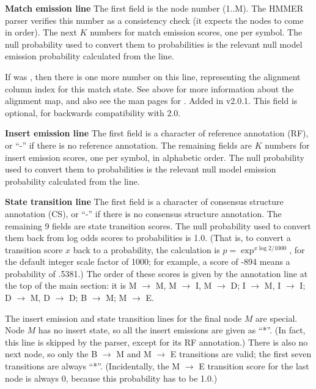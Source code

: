 \begin{wideitem}

\item [\textbf{Match emission line}] The first field is the node number (1..M).
The HMMER parser verifies this number as a consistency check (it
expects the nodes to come in order). The next $K$ numbers for match
emission scores, one per symbol. The null probability used to convert
them to probabilities is the relevant null model emission probability
calculated from the  line.

If  was , then there is one more number on this
line, representing the alignment column index for this match state.
See  above for more information about the alignment map, and
also see the man pages for .  Added in
v2.0.1. This field is optional, for backwards compatibility with 2.0.

\item [\textbf{Insert emission line}] The first field is a character of
reference annotation (RF), or ``-'' if there is no reference
annotation. The remaining fields are $K$ numbers for insert emission
scores, one per symbol, in alphabetic order. The null probability used
to convert them to probabilities is the relevant null model emission
probability calculated from the  line.

\item [\textbf{State transition line}] The first field is a character
of consensus structure annotation (CS), or ``-'' if there is no
consensus structure annotation. The remaining 9 fields are state
transition scores. The null probability used to convert them back from
log odds scores to probabilities is 1.0. (That is, to convert a
transition score $x$ back to a probability, the calculation is $p =
\exp^{x \log 2 / 1000}$, for the default integer scale factor of 1000;
for example, a score of -894 means a probability of .5381.)  The order
of these scores is given by the annotation line at the top of the main
section: it is M $\rightarrow$ M, M $\rightarrow$ I, M $\rightarrow$
D; I $\rightarrow$ M, I $\rightarrow$ I; D $\rightarrow$ M, D
$\rightarrow$ D; B $\rightarrow$ M; M $\rightarrow$ E.

\end{wideitem}

The insert emission and state transition lines for the final node $M$
are special.  Node $M$ has no insert state, so all the insert
emissions are given as ``*''. (In fact, this line is skipped by the
parser, except for its RF annotation.) There is also no next node, so
only the B $\rightarrow$ M and M $\rightarrow$ E transitions are
valid; the first seven transitions are always ``*''.  (Incidentally,
the M $\rightarrow$ E transition score for the last node is always 0,
because this probability has to be 1.0.)

